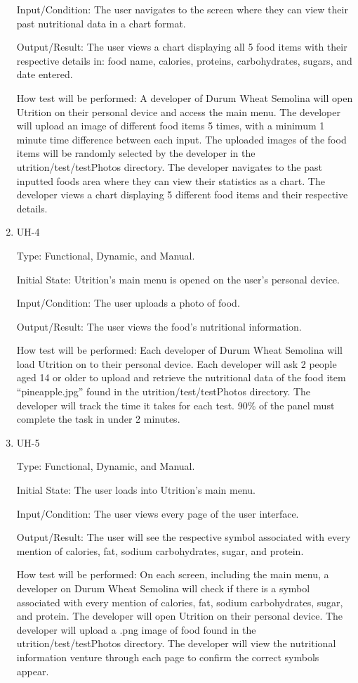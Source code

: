 \documentclass[12pt, titlepage]{article}
\begin{document}
\begin{enumerate}
		Input/Condition: The user navigates to the screen where they can view their past nutritional data in a chart format.
		
		Output/Result: The user views a chart displaying all 5 food items with their respective details in: food name, calories, proteins, carbohydrates, sugars, and date entered.
		
		How test will be performed: A developer of Durum Wheat Semolina will open Utrition on their personal device and access the main menu. The developer will upload an image of different food items 5 times, with a minimum 1 minute time difference between each input. The uploaded images of the food items will be randomly selected by the developer in the utrition/test/testPhotos directory. The developer navigates to the past inputted foods area where they can view their statistics as a chart. The developer views a chart displaying 5 different food items and their respective details.
		
		\item{UH-4}
		
		Type: Functional, Dynamic, and Manual.
		
		Initial State: Utrition’s main menu is opened on the user’s personal device.
		
		Input/Condition: The user uploads a photo of food.
		
		Output/Result: The user views the food’s nutritional information.
		
		How test will be performed: Each developer of Durum Wheat Semolina will load Utrition on to their personal device. Each developer will ask 2 people aged 14 or older to upload and retrieve the nutritional data of the food item “pineapple.jpg” found in the utrition/test/testPhotos directory. The developer will track the time it takes for each test. 90\% of the panel must complete the task in under 2 minutes.
		
		\item{UH-5}
		
		Type: Functional, Dynamic, and Manual.
		
		Initial State: The user loads into Utrition’s main menu.
		
		Input/Condition: The user views every page of the user interface.
		
		Output/Result: The user will see the respective symbol associated with every mention of calories, fat, sodium carbohydrates, sugar, and protein.
		
		How test will be performed: On each screen, including the main menu, a developer on Durum Wheat Semolina will check if there is a symbol associated with every mention of calories, fat, sodium carbohydrates, sugar, and protein. The developer will open Utrition on their personal device. The developer will upload a .png image of food found in the utrition/test/testPhotos directory. The developer will view the nutritional information venture through each page to confirm the correct symbols appear.
		

\end{enumerate}
\end{document}
